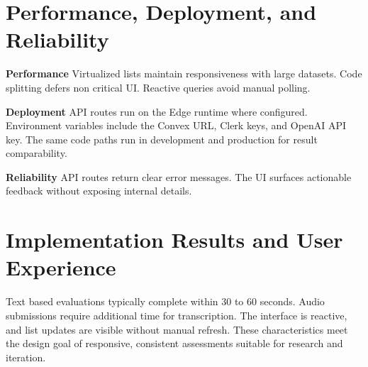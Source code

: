 \section{Performance, Deployment, and Reliability}
\textbf{Performance} Virtualized lists maintain responsiveness with large datasets. Code splitting defers non critical UI. Reactive queries avoid manual polling.

\textbf{Deployment} API routes run on the Edge runtime where configured. Environment variables include the Convex URL, Clerk keys, and OpenAI API key. The same code paths run in development and production for result comparability.

\textbf{Reliability} API routes return clear error messages. The UI surfaces actionable feedback without exposing internal details.

\section{Implementation Results and User Experience}\label{sec:results}
Text based evaluations typically complete within 30 to 60 seconds. Audio submissions require additional time for transcription. The interface is reactive, and list updates are visible without manual refresh. These characteristics meet the design goal of responsive, consistent assessments suitable for research and iteration.
